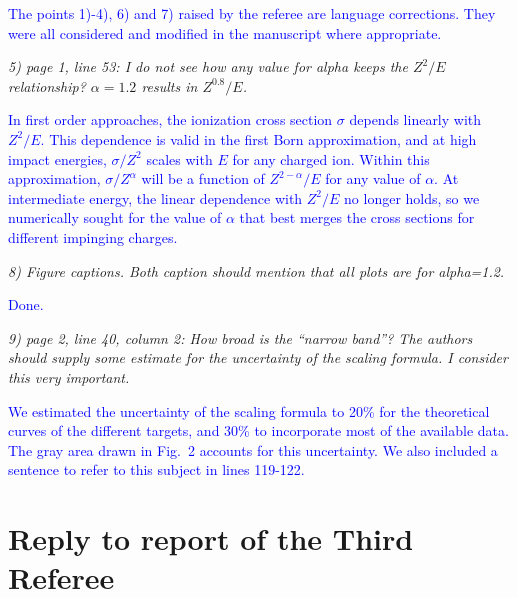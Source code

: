 \documentclass[a4paper,12pt]{article}
\def\reviewer#1{\vspace{0.35cm}\textsl{#1}}
\def\reply#1{\vspace{0.1cm}\textcolor{blue}{#1}}
\begin{document}
\vspace{0.2cm}

\reply{The points 1)-4), 6) and 7) raised by the referee are language
corrections. They were all considered and modified in the manuscript
where appropriate.}


\reviewer{5) page 1, line 53: I do not see how any value for alpha keeps
the $Z^2/E$ relationship? $\alpha = 1.2$ results in $Z^{0.8}/E$.}

\reply{In first order approaches, the ionization cross section $\sigma$
depends linearly with $Z^2/E$. This dependence is valid in the first Born 
approximation, and at high impact energies, $\sigma/Z^{2}$ scales with
$E$ for any charged ion. Within this approximation, $\sigma/Z^{\alpha}$
will be a function of $Z^{2-\alpha}/E$ for any value of $\alpha$. At
intermediate energy, the linear dependence with $Z^2/E$ no longer holds,
so we numerically sought for the value of $\alpha$ that best merges
the cross sections for different impinging charges.}

\reviewer{8) Figure captions. Both caption should mention that all 
plots are for alpha=1.2.}

\reply{Done.}

\reviewer{9) page 2, line 40, column 2: How broad is the ``narrow 
band''? The authors should supply some estimate for the uncertainty of 
the scaling formula. I consider this very important.}

\reply{We estimated the uncertainty of the scaling formula to 20\% for 
the theoretical curves of the different targets, and 30\% to incorporate 
most of the available data. The gray area drawn in Fig.~2 accounts for 
this uncertainty. We also included a sentence to refer to this subject 
in lines 119-122.}

\vspace{0.2 cm}
\section{Reply to report of the Third Referee}
\end{document}
